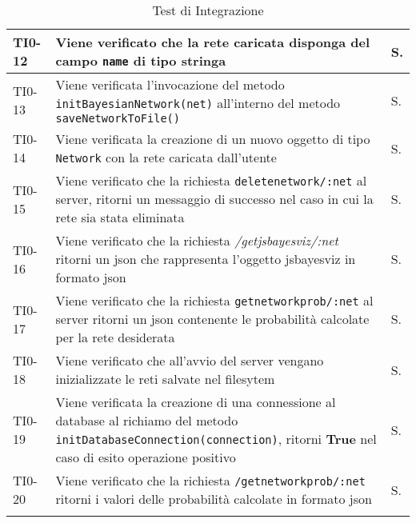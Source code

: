 \begin{longtable}{|C{.15\textwidth}|m{.66\textwidth}|C{.10\textwidth}|}
\hline
{}TI0-12 & Viene verificato che la rete caricata disponga del campo \texttt{name} di tipo \textbf{stringa} & S. \\ 
\hline
TI0-13 & Viene verificata l'invocazione del metodo \texttt{initBayesianNetwork(net)} all'interno del metodo \texttt{saveNetworkToFile()} & S. \\ 
\hline
{}TI0-14 & Viene verificata la creazione di un nuovo oggetto di tipo \texttt{Network} con la rete caricata dall'utente & S. \\ 
\hline
TI0-15 & Viene verificato che la richiesta \texttt{deletenetwork/:net} al server, ritorni un messaggio di successo nel caso in cui la rete sia stata eliminata & S. \\
\hline
{}TI0-16 & Viene verificato che la richiesta \textit{/getjsbayesviz/:net} ritorni un json che rappresenta l'oggetto jsbayesviz in formato json & S.\\
\hline
TI0-17 & Viene verificato che la richiesta \texttt{getnetworkprob/:net} al server ritorni un json contenente le probabilità calcolate per la rete desiderata & S. \\ 
\hline 
{}TI0-18 & Viene verificato che all'avvio del server vengano inizializzate le reti salvate nel filesytem & S. \\ 
\hline
TI0-19 &  Viene verificata la creazione di una connessione al database al richiamo del metodo \texttt{initDatabaseConnection(connection)}, ritorni \textbf{True} nel caso di esito operazione positivo & S.\\ 
\hline
{}TI0-20 & Viene verificato che la richiesta \texttt{/getnetworkprob/:net} ritorni i valori delle probabilità calcolate in formato json & S. \\ 
\hline

\caption{Test di Integrazione}
\label{testintegrazione}
\end{longtable}